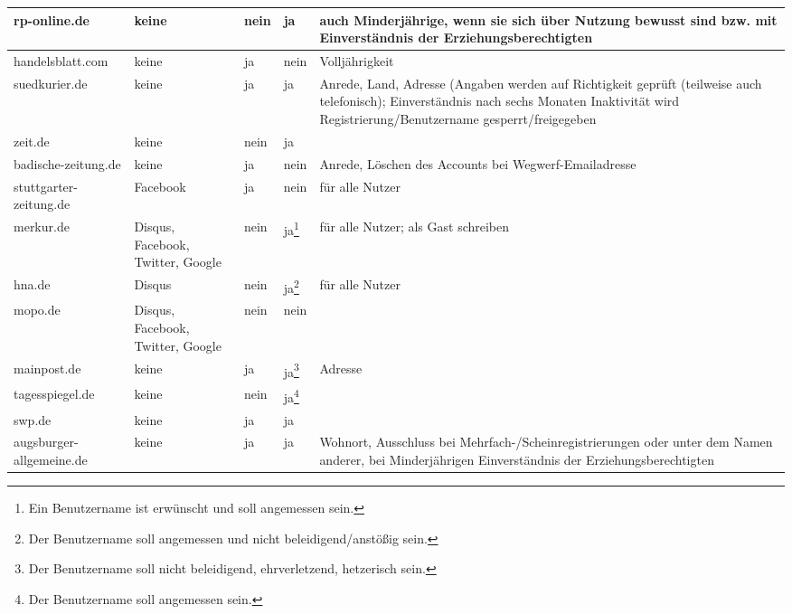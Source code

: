 \begin{longtable}{p{24mm}p{20mm}p{10mm}p{10mm}p{60mm}}
rp-online.de %
& keine
& \centerline{nein}
& \centerline{ja}
& auch Minderjährige, wenn sie sich über Nutzung bewusst sind bzw. mit
  Einverständnis der Erziehungsberechtigten
\\\midrule

handelsblatt.com %
& keine
& \centerline{ja}
& \centerline{nein}
& Volljährigkeit
\\\midrule

suedkurier.de %
& keine
& \centerline{ja}
& \centerline{ja}
& Anrede, Land, Adresse (Angaben werden auf Richtigkeit geprüft (teilweise auch
  telefonisch); Einverständnis nach sechs Monaten Inaktivität wird
  Registrierung/Benutzername gesperrt/freigegeben
\\\midrule

zeit.de %
& keine
& \centerline{nein}
& \centerline{ja}
&
\\\midrule

badische-zeitung.de %
& keine
& \centerline{ja}
& \centerline{nein}
& Anrede, Löschen des Accounts bei Wegwerf-Emailadresse
\\\midrule

stuttgarter-zeitung.de %
& Facebook
& \centerline{ja}
& \centerline{nein}
& für alle Nutzer
\\\midrule

merkur.de %
& Disqus, Facebook, Twitter, Google
& \centerline{nein}
& \centerline{ja\footnote{Ein Benutzername ist erwünscht und soll angemessen
  sein.}}
& für alle Nutzer; als Gast schreiben
\\\midrule

hna.de %
& Disqus
& \centerline{nein}
& \centerline{ja\footnote{Der Benutzername soll angemessen und nicht
  beleidigend/anstößig sein.}}
& für alle Nutzer
\\\midrule

mopo.de %
& Disqus, Facebook, Twitter, Google
& \centerline{nein}
& \centerline{nein}
&
\\\midrule

mainpost.de %
& keine
& \centerline{ja}
& \centerline{ja\footnote{Der Benutzername soll nicht beleidigend,
  ehrverletzend, hetzerisch sein.}}
& Adresse
\\\midrule

tagesspiegel.de %
& keine
& \centerline{nein}
& \centerline{ja\footnote{Der Benutzername soll angemessen sein.}}
&
\\\midrule

swp.de %
& keine
& \centerline{ja}
& \centerline{ja}
&
\\\midrule

augsburger-allgemeine.de %
& keine
& \centerline{ja}
& \centerline{ja}
& Wohnort, Ausschluss bei Mehrfach-/Scheinregistrierungen oder unter dem Namen
  anderer, bei Minderjährigen Einverständnis der Erziehungsberechtigten
\end{longtable}
\endgroup

